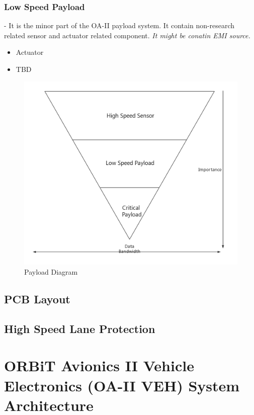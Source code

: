 \documentclass[12pt,article]{memoir}
\begin{document}
\subsection{Low Speed Payload} - It is the minor part of the OA-II payload system. It contain non-research related sensor and actuator related component. \textit{It might be conatin EMI source.}
\begin{itemize}
\item Actuator
\item TBD
\end{itemize}
\begin{figure}[htp]
\includegraphics[width=\textwidth]{payloadCata.png}
 \caption{Payload Diagram}	
\end{figure}
\section{PCB Layout}
\section{High Speed Lane Protection}
\chapter{ORBiT Avionics II Vehicle Electronics (OA-II VEH) System Architecture}
\end{document}
